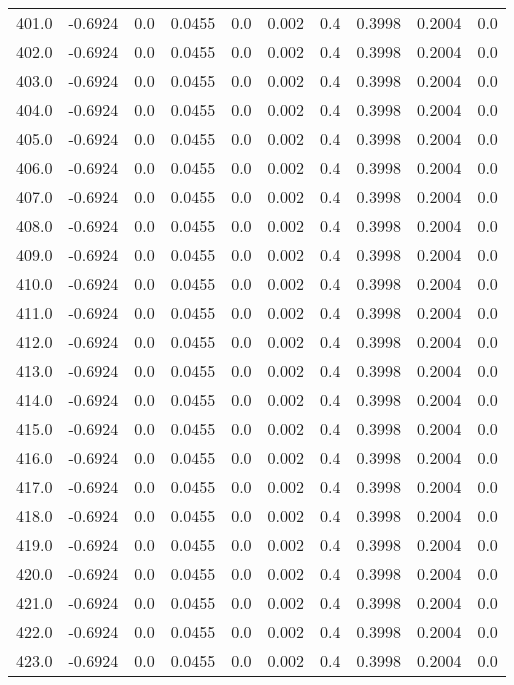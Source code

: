 \begin{longtable}{lrrrrrrrrr}
401.0 & -0.6924 & 0.0 & 0.0455 & 0.0 & 0.002 & 0.4 & 0.3998 & 0.2004 & 0.0 \\
402.0 & -0.6924 & 0.0 & 0.0455 & 0.0 & 0.002 & 0.4 & 0.3998 & 0.2004 & 0.0 \\
403.0 & -0.6924 & 0.0 & 0.0455 & 0.0 & 0.002 & 0.4 & 0.3998 & 0.2004 & 0.0 \\
404.0 & -0.6924 & 0.0 & 0.0455 & 0.0 & 0.002 & 0.4 & 0.3998 & 0.2004 & 0.0 \\
405.0 & -0.6924 & 0.0 & 0.0455 & 0.0 & 0.002 & 0.4 & 0.3998 & 0.2004 & 0.0 \\
406.0 & -0.6924 & 0.0 & 0.0455 & 0.0 & 0.002 & 0.4 & 0.3998 & 0.2004 & 0.0 \\
407.0 & -0.6924 & 0.0 & 0.0455 & 0.0 & 0.002 & 0.4 & 0.3998 & 0.2004 & 0.0 \\
408.0 & -0.6924 & 0.0 & 0.0455 & 0.0 & 0.002 & 0.4 & 0.3998 & 0.2004 & 0.0 \\
409.0 & -0.6924 & 0.0 & 0.0455 & 0.0 & 0.002 & 0.4 & 0.3998 & 0.2004 & 0.0 \\
410.0 & -0.6924 & 0.0 & 0.0455 & 0.0 & 0.002 & 0.4 & 0.3998 & 0.2004 & 0.0 \\
411.0 & -0.6924 & 0.0 & 0.0455 & 0.0 & 0.002 & 0.4 & 0.3998 & 0.2004 & 0.0 \\
412.0 & -0.6924 & 0.0 & 0.0455 & 0.0 & 0.002 & 0.4 & 0.3998 & 0.2004 & 0.0 \\
413.0 & -0.6924 & 0.0 & 0.0455 & 0.0 & 0.002 & 0.4 & 0.3998 & 0.2004 & 0.0 \\
414.0 & -0.6924 & 0.0 & 0.0455 & 0.0 & 0.002 & 0.4 & 0.3998 & 0.2004 & 0.0 \\
415.0 & -0.6924 & 0.0 & 0.0455 & 0.0 & 0.002 & 0.4 & 0.3998 & 0.2004 & 0.0 \\
416.0 & -0.6924 & 0.0 & 0.0455 & 0.0 & 0.002 & 0.4 & 0.3998 & 0.2004 & 0.0 \\
417.0 & -0.6924 & 0.0 & 0.0455 & 0.0 & 0.002 & 0.4 & 0.3998 & 0.2004 & 0.0 \\
418.0 & -0.6924 & 0.0 & 0.0455 & 0.0 & 0.002 & 0.4 & 0.3998 & 0.2004 & 0.0 \\
419.0 & -0.6924 & 0.0 & 0.0455 & 0.0 & 0.002 & 0.4 & 0.3998 & 0.2004 & 0.0 \\
420.0 & -0.6924 & 0.0 & 0.0455 & 0.0 & 0.002 & 0.4 & 0.3998 & 0.2004 & 0.0 \\
421.0 & -0.6924 & 0.0 & 0.0455 & 0.0 & 0.002 & 0.4 & 0.3998 & 0.2004 & 0.0 \\
422.0 & -0.6924 & 0.0 & 0.0455 & 0.0 & 0.002 & 0.4 & 0.3998 & 0.2004 & 0.0 \\
423.0 & -0.6924 & 0.0 & 0.0455 & 0.0 & 0.002 & 0.4 & 0.3998 & 0.2004 & 0.0 \\

\end{longtable}
